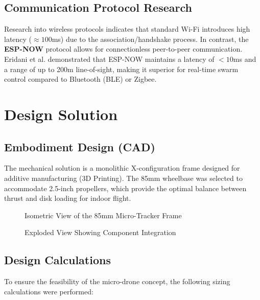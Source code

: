 \documentclass[12pt, a4paper]{article}
\begin{document}
\subsection{Communication Protocol Research}
Research into wireless protocols indicates that standard Wi-Fi introduces high latency ($\approx 100$ms) due to the association/handshake process. In contrast, the \textbf{ESP-NOW} protocol allows for connectionless peer-to-peer communication. Eridani et al. demonstrated that ESP-NOW maintains a latency of $<10$ms and a range of up to 200m line-of-sight, making it superior for real-time swarm control compared to Bluetooth (BLE) or Zigbee.

\section{Design Solution}

\subsection{Embodiment Design (CAD)}
The mechanical solution is a monolithic X-configuration frame designed for additive manufacturing (3D Printing). The 85mm wheelbase was selected to accommodate 2.5-inch propellers, which provide the optimal balance between thrust and disk loading for indoor flight.

\begin{figure}[H]
    \centering
    \caption{Isometric View of the 85mm Micro-Tracker Frame}
    \label{fig:cad_iso}
\end{figure}

\begin{figure}[H]
    \centering
    \caption{Exploded View Showing Component Integration}
    \label{fig:cad_expl}
\end{figure}

\subsection{Design Calculations}
To ensure the feasibility of the micro-drone concept, the following sizing calculations were performed:
\end{document}
